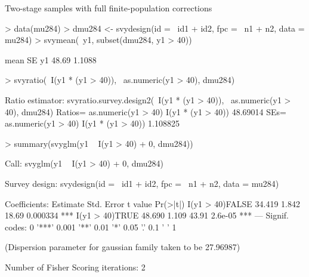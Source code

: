 \documentclass{article}
\begin{document}
Two-stage samples with full finite-population corrections
\begin{Schunk}
\begin{Sinput}
> data(mu284)
> dmu284 <- svydesign(id = ~id1 + id2, fpc = ~n1 + n2, data = mu284)
> svymean(~y1, subset(dmu284, y1 > 40))
\end{Sinput}
\begin{Soutput}
    mean     SE
y1 48.69 1.1088
\end{Soutput}
\begin{Sinput}
> svyratio(~I(y1 * (y1 > 40)), ~as.numeric(y1 > 40), dmu284)
\end{Sinput}
\begin{Soutput}
Ratio estimator: svyratio.survey.design2(~I(y1 * (y1 > 40)), ~as.numeric(y1 > 
    40), dmu284)
Ratios=
                  as.numeric(y1 > 40)
I(y1 * (y1 > 40))            48.69014
SEs=
                  as.numeric(y1 > 40)
I(y1 * (y1 > 40))            1.108825
\end{Soutput}
\begin{Sinput}
> summary(svyglm(y1 ~ I(y1 > 40) + 0, dmu284))
\end{Sinput}
\begin{Soutput}
Call:
svyglm(y1 ~ I(y1 > 40) + 0, dmu284)

Survey design:
svydesign(id = ~id1 + id2, fpc = ~n1 + n2, data = mu284)

Coefficients:
                Estimate Std. Error t value Pr(>|t|)    
I(y1 > 40)FALSE   34.419      1.842   18.69 0.000334 ***
I(y1 > 40)TRUE    48.690      1.109   43.91  2.6e-05 ***
---
Signif. codes:  0 '***' 0.001 '**' 0.01 '*' 0.05 '.' 0.1 ' ' 1 

(Dispersion parameter for gaussian family taken to be 27.96987)

Number of Fisher Scoring iterations: 2
\end{Soutput}
\end{Schunk}
\end{document}
